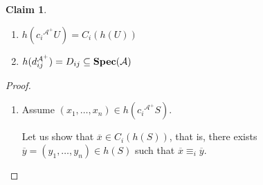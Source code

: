 \documentclass{article}
\theoremstyle{defin}
\theoremstyle{theorem}
\theoremstyle{claim}
\newtheorem{claim}{Claim}
\theoremstyle{prop}
\theoremstyle{lemma}
\theoremstyle{fact}
\theoremstyle{remark}
\theoremstyle{ex}
\theoremstyle{col}
\theoremstyle{question}
\begin{document}
\begin{claim}
$ $

\begin{enumerate}
\item $h(c_i{^{\mathcal{A}^{+}}} U) = C_i (h(U))$
\item $h(d_{ij}^{\mathcal{A}^{+}}) = D_{ij} \subseteq {\bf Spec}(\mathcal{A})$
\end{enumerate}
\end{claim}

\begin{proof}
$ $

\begin{enumerate}
\item Assume $(x_1, \dots, x_n) \in h(c_i{^{\mathcal{A}^{+}}} S)$.

Let us show that $\overline{x} \in C_i (h(S))$, that is, there exists $\overline{y} = (y_1, \dots, y_n) \in h(S)$ such that $\overline{x} \equiv_{i} \overline{y}$.


\end{enumerate}
\end{proof}
\end{document}
